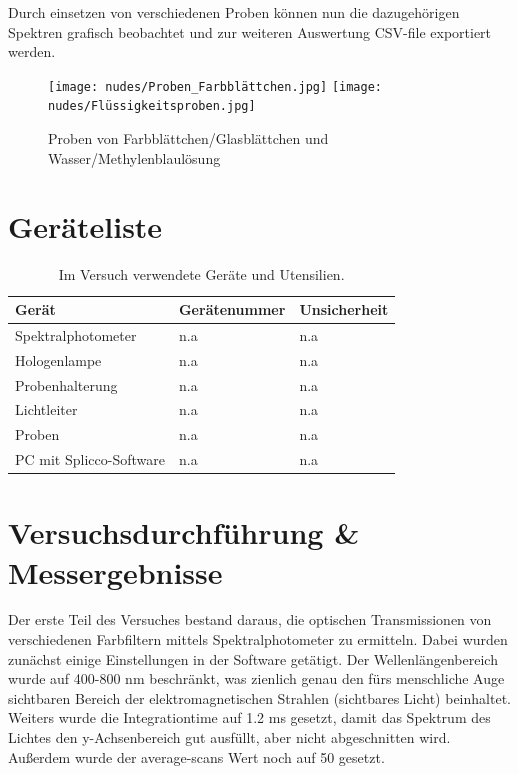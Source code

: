 \documentclass[12pt,a4paper,twoside]{article}
\begin{document}
\noindent
Durch einsetzen von verschiedenen Proben können nun die dazugehörigen Spektren grafisch beobachtet und zur weiteren Auswertung CSV-file exportiert werden.

\begin{figure}[H]
    \centering
    \texttt{[image: nudes/Proben\_Farbblättchen.jpg]}
    \texttt{[image: nudes/Flüssigkeitsproben.jpg]}
    \caption{Proben von Farbblättchen/Glasblättchen und Wasser/Methylenblaulösung}
    \label{fig:Proben}
\end{figure}


    
\section{Geräteliste} %

\begin{table}[H]
    \centering
    \caption{Im Versuch verwendete Geräte und Utensilien.}
    \label{tab:geraete}
    \begin{tabular}{| l | l | l |}
        \hline
        Gerät   & Gerätenummer  & Unsicherheit \\
        \hline
        Spektralphotometer & {n.a} & {n.a} \\
        Hologenlampe & {n.a} & {n.a} \\
        Probenhalterung & {n.a} & {n.a} \\
        Lichtleiter & {n.a} & {n.a} \\
        Proben & {n.a} & {n.a} \\
        PC mit Splicco-Software & {n.a} & {n.a} \\
        \hline
    \end{tabular}
\end{table}


\section{Versuchsdurchführung \& Messergebnisse} %

Der erste Teil des Versuches bestand daraus, die optischen Transmissionen von verschiedenen Farbfiltern mittels Spektralphotometer zu ermitteln.
Dabei wurden zunächst einige Einstellungen in der Software getätigt. Der Wellenlängenbereich wurde auf 400-800 nm beschränkt, was zienlich genau den fürs menschliche Auge sichtbaren Bereich der elektromagnetischen Strahlen (sichtbares Licht) beinhaltet.
Weiters wurde die Integrationtime auf 1.2 ms gesetzt, damit das Spektrum des Lichtes den y-Achsenbereich gut ausfüllt, aber nicht abgeschnitten wird.
Außerdem wurde der average-scans Wert noch auf 50 gesetzt. \newline
\end{document}
